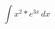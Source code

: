 \documentclass[../rgr1.tex]{subfiles}
\begin{document}
\Solution

\begin{equation}
	\int x^2 * e^{3x} \, dx
\end{equation}

\Answer{
	<++>
}
\end{document}
